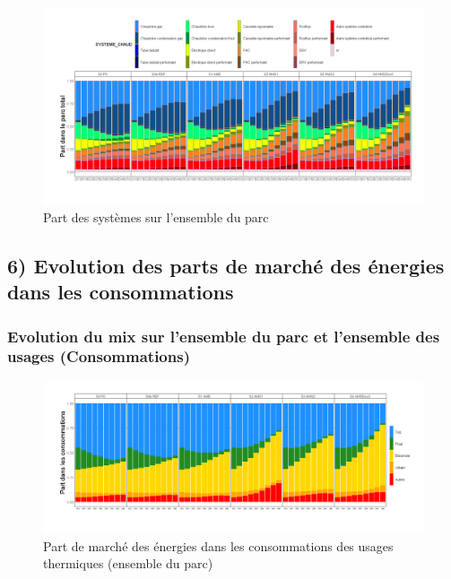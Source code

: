 \documentclass[]{article}
\begin{document}
\begin{figure}
\centering
\includegraphics{Exemple_sortiestertiaire_files/figure-latex/Evol_PM_syst_all-1.png}
\caption{Part des systèmes sur l'ensemble du parc}
\end{figure}

\clearpage
\newpage

\clearpage
\pagebreak

\subsection{6) Evolution des parts de marché des énergies dans les
consommations}\label{evolution-des-parts-de-marche-des-energies-dans-les-consommations}

\subsubsection{Evolution du mix sur l'ensemble du parc et l'ensemble des
usages
(Consommations)}\label{evolution-du-mix-sur-lensemble-du-parc-et-lensemble-des-usages-consommations}

\begin{figure}
\centering
\includegraphics{Exemple_sortiestertiaire_files/figure-latex/Evol_PM_ener_thermiques-1.png}
\caption{Part de marché des énergies dans les consommations des usages
thermiques (ensemble du parc)}
\end{figure}
\end{document}
